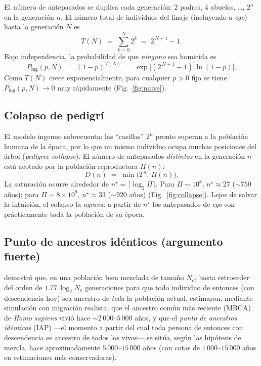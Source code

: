 \documentclass[11pt]{article}
\begin{document}
El n\'umero de antepasados se duplica cada generaci\'on: $2$ padres, $4$ abuelos,
\dots, $2^n$ en la generaci\'on $n$. El n\'umero total de individuos del linaje
(incluyendo a \emph{ego}) hasta la generaci\'on $N$ es
\begin{equation}
  T(N) \;=\; \sum_{k=0}^{N} 2^k \;=\; 2^{\,N+1}-1 .
\end{equation}
Bajo independencia, la probabilidad de que \emph{ninguno} sea homicida es
\begin{equation}\label{eq:naive}
  P_{\text{ing}}(p,N) \;=\; (1-p)^{\,T(N)} \;=\;
  \exp\!\big[(2^{\,N+1}-1)\,\ln(1-p)\big].
\end{equation}
Como $T(N)$ crece exponencialmente, para cualquier $p>0$ fijo se tiene
$P_{\text{ing}}(p,N)\to 0$ muy r\'apidamente (Fig.~\ref{fig:naive}).

\subsection{Colapso de pedigr\'i}

El modelo ingenuo sobrecuenta: las ``casillas'' $2^n$ pronto superan a la
poblaci\'on humana de la \'epoca, por lo que un mismo individuo ocupa muchas
posiciones del \'arbol (\emph{pedigree collapse}). El n\'umero de antepasados
\emph{distintos} en la generaci\'on $n$ est\'a acotado por la poblaci\'on
reproductora $\Pi(n)$:
\begin{equation}\label{eq:collapse}
  D(n) \;=\; \min\!\big(2^{\,n},\, \Pi(n)\big).
\end{equation}
La saturaci\'on ocurre alrededor de $n^\star = \lceil \log_2 \Pi \rceil$. Para
$\Pi \sim 10^{8}$, $n^\star \approx 27$ ($\sim 750$ a\~nos); para
$\Pi \sim 8\times 10^{9}$, $n^\star \approx 33$ ($\sim 920$ a\~nos)
(Fig.~\ref{fig:collapse}). Lejos de salvar la intuici\'on, el colapso la
\emph{agrava}: a partir de $n^\star$ los antepasados de \emph{ego} son
pr\'acticamente toda la poblaci\'on de su \'epoca.

\subsection{Punto de ancestros id\'enticos (argumento fuerte)}

\citet{chang1999} demostr\'o que, en una poblaci\'on bien mezclada de tama\~no
$N_e$, basta retroceder del orden de $1{.}77\,\log_2 N_e$ generaciones para que
todo individuo de entonces (con descendencia hoy) sea ancestro de \emph{toda} la
poblaci\'on actual. \citet{rohde2004} estimaron, mediante simulaci\'on con
migraci\'on realista, que el ancestro com\'un m\'as reciente (MRCA) de
\emph{Homo sapiens} vivi\'o hace $\sim 2\,000$--$5\,000$ a\~nos, y que el
\emph{punto de ancestros id\'enticos} (IAP) ---el momento a partir del cual toda
persona de entonces con descendencia es ancestro de todos los vivos--- se sit\'ua,
seg\'un las hip\'otesis de mezcla, hace aproximadamente $5\,000$--$15\,000$
a\~nos (con cotas de $1\,000$--$15\,000$ a\~nos en estimaciones m\'as
conservadoras).
\end{document}
